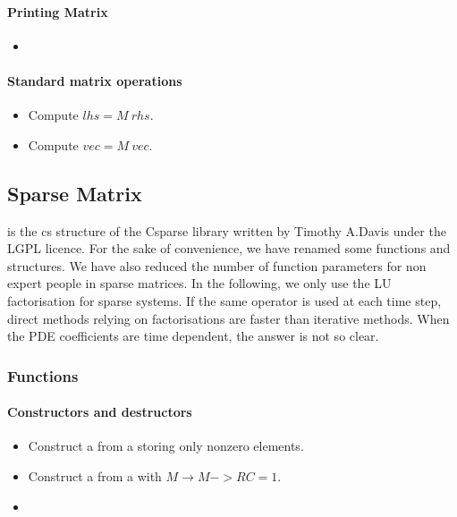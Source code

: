 \paragraph{Printing Matrix}
\begin{itemize}
\item {}
\end{itemize}

\paragraph{Standard matrix operations}
\begin{itemize}
\item {}
  \sshortdescribe Compute $ lhs=M \ rhs$.
\item {}
  \sshortdescribe Compute $ vec=M \ vec$.
\end{itemize}


\subsection{Sparse Matrix}

 is the cs structure of the Csparse library written by
Timothy A.Davis under the LGPL licence.  For the sake of convenience, we have
renamed some functions and structures. We have also reduced the number of
function parameters for non expert people in sparse matrices.  In the following,
we only use the LU factorisation for sparse systems. If the same operator is
used at each time step, direct methods relying on factorisations are faster than
iterative methods. When the PDE coefficients are time dependent, the answer is
not so clear.

\subsubsection{Functions}
\paragraph{Constructors and destructors}
\begin{itemize}
\item {}
  \sshortdescribe Construct a  from  a
   storing only nonzero elements.
\item {}
  \sshortdescribe Construct a  from  a
   with $M\rightarrow M->RC =1$.
\item {}
\end{itemize}

